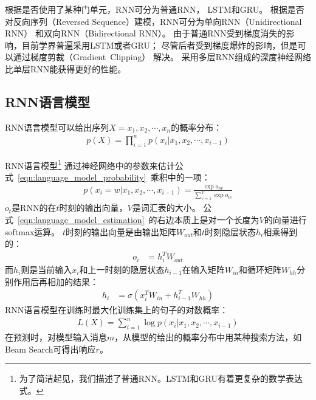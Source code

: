 根据是否使用了某种门单元，RNN可分为普通RNN，
LSTM和GRU。
根据是否对反向序列（Reversed Sequence）建模，RNN可分为单向RNN（Unidirectional RNN）
和双向RNN（Bidirectional RNN）。
由于普通RNN受到梯度消失的影响，目前学界普遍采用LSTM或者GRU；
尽管后者受到梯度爆炸的影响，但是可以通过梯度剪裁（Gradient~Clipping）
解决。
采用多层RNN组成的深度神经网络比单层RNN能获得更好的性能。

\subsection{RNN语言模型}\label{subsec:RNNLM}
RNN语言模型可以给出序列$X=x_1, x_2, \cdots, x_n$的概率分布：
\begin{align}
    p(X) = \prod_{i=1}^{n} p(x_i|x_1, x_2, \cdots, x_{i-1})
    \label{eqn:language_model_probability}
\end{align}

RNN语言模型\footnote{为了简洁起见，我们描述了普通RNN。LSTM和GRU有着更复杂的数学表达式。}
通过神经网络中的参数来估计公式~\ref{eqn:language_model_probability}~乘积中的一项：
\begin{align}
    p(x_i = w|x_1, x_2, \cdots, x_{i-1}) = \frac{\exp{o_{tw}}}{\sum_{v=1}^V \exp{o_{tv}}}
    \label{eqn:language_model_estimation}
\end{align}
$o_t$是RNN的在$t$时刻的输出向量，$V$是词汇表的大小。
公式~\ref{eqn:language_model_estimation}~的右边本质上是对一个长度为$V$的向量进行softmax运算。
$t$时刻的输出向量是由输出矩阵$W_{out}$和$t$时刻隐层状态$h_i$相乘得到的：
\begin{align}
    o_i &= h_i^T W_{out}
\end{align}
而$h_i$则是当前输入$x_i$和上一时刻的隐层状态$h_{i-1}$在输入矩阵$W_{in}$和循环矩阵$W_{hh}$分别作用后再相加的结果：
\begin{align}
    h_i &= \sigma \left( x_i^T W_{in} + h_{i-1}^T W_{hh} \right)
\end{align}
RNN语言模型在训练时最大化训练集上的句子的对数概率：
\begin{align}
    \mathit{L(X)} = \sum_{i=1}^n \log p(x_i|x_1, x_2, \cdots, x_{i-1})
\end{align}
在预测时，对模型输入消息$m$，从模型的给出的概率分布中用某种搜索方法，如Beam Search可得出响应$r$。

